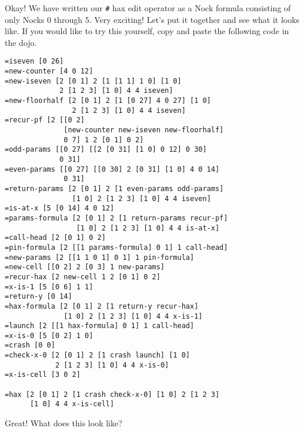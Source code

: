\documentclass[twoside]{article}
\begin{document}
Okay! We have written our \lstinline[style=inlinecode]{#} hax edit operator as a Nock formula consisting of only Nocks 0 through 5. Very exciting! Let's put it together and see what it looks like. If you would like to try this yourself, copy and paste the following code in the dojo.

\begin{lstlisting}[style=listingcode]
=iseven [0 26]
=new-counter [4 0 12]
=new-iseven [2 [0 1] 2 [1 [1 1] 1 0] [1 0]
             2 [1 2 3] [1 0] 4 4 iseven]
=new-floorhalf [2 [0 1] 2 [1 [0 27] 4 0 27] [1 0]
                2 [1 2 3] [1 0] 4 4 iseven]
=recur-pf [2 [[0 2]
              [new-counter new-iseven new-floorhalf]
              0 7] 1 2 [0 1] 0 2] 
=odd-params [[0 27] [[2 [0 31] [1 0] 0 12] 0 30]
             0 31]
=even-params [[0 27] [[0 30] 2 [0 31] [1 0] 4 0 14]
              0 31]
=return-params [2 [0 1] 2 [1 even-params odd-params]
                [1 0] 2 [1 2 3] [1 0] 4 4 iseven]
=is-at-x [5 [0 14] 4 0 12]
=params-formula [2 [0 1] 2 [1 return-params recur-pf]
                 [1 0] 2 [1 2 3] [1 0] 4 4 is-at-x]
=call-head [2 [0 1] 0 2]
=pin-formula [2 [[1 params-formula] 0 1] 1 call-head]
=new-params [2 [[1 1 0 1] 0 1] 1 pin-formula]
=new-cell [[0 2] 2 [0 3] 1 new-params]
=recur-hax [2 new-cell 1 2 [0 1] 0 2]
=x-is-1 [5 [0 6] 1 1]
=return-y [0 14]
=hax-formula [2 [0 1] 2 [1 return-y recur-hax]
              [1 0] 2 [1 2 3] [1 0] 4 4 x-is-1]
=launch [2 [[1 hax-formula] 0 1] 1 call-head]
=x-is-0 [5 [0 2] 1 0]
=crash [0 0]
=check-x-0 [2 [0 1] 2 [1 crash launch] [1 0]
            2 [1 2 3] [1 0] 4 4 x-is-0]
=x-is-cell [3 0 2]

=hax [2 [0 1] 2 [1 crash check-x-0] [1 0] 2 [1 2 3]
      [1 0] 4 4 x-is-cell]
\end{lstlisting}

Great! What does this look like?
\end{document}
